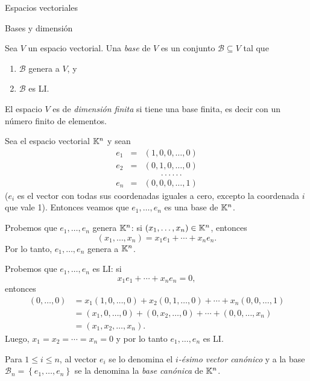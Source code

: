\begin{chapter}{Espacios vectoriales}
\begin{section}{Bases y dimensi\'on}
 \begin{definicion}\label{def-base}
     Sea $V$ un espacio vectorial. Una \textit{base} de $V$ es un conjunto $\mathcal B \subseteq V$ tal que
     \begin{enumerate}
         \item\label{it.genera} $\mathcal B$ genera a $V$, y
         \item\label{it.li} $\mathcal B$ es LI.
     \end{enumerate}
      El espacio $V$ es de \textit{dimensión finita} si tiene una base finita,  es decir con  un número finito de elementos.
 \end{definicion}



\begin{ejemplo*} Sea el espacio vectorial $\mathbb K^n$ y sean
    \begin{equation*}
    \begin{array}{rcl}
    e_1 &=& (1,0,0,\ldots,0) \\
    e_2 &=& (0,1,0,\ldots,0) \\
    &&\qquad.\,.\,.\,.\,.\,.\,\\ 
    e_n&=& (0,0,0,\ldots,1)
    \end{array}
    \end{equation*}
    ($e_i$ es el vector con todas sus coordenadas iguales a cero,  excepto  la coordenada $i$ que vale 1). Entonces veamos que  $e_1,\ldots,e_n$ es una base de $\mathbb K^n$.
    
    Probemos que $e_1,\ldots,e_n$ genera  $\mathbb K^n$: si $(x_1,\ldots,x_n) \in \mathbb K^n$,  entonces
        $$
        (x_1,\ldots,x_n) = x_1e_1+\cdots+x_ne_n.
        $$
        Por lo tanto, $e_1,\ldots,e_n$ genera a  $\mathbb K^n$.
        
        Probemos que $e_1,\ldots,e_n$ es LI: si 
        $$
        x_1e_1+\cdots+x_ne_n =0,
        $$
        entonces
        \begin{align*}
            (0,\ldots,0) &= x_1(1,0,\ldots,0)+ x_2(0,1,\ldots,0)+\cdots+x_n(0,0,\ldots,1)\\ 
            &=  (x_1,0,\ldots,0)+(0,x_2,\ldots,0)+\cdots+(0,0,\ldots,x_n)\\ &= (x_1,x_2,\ldots,x_n).
        \end{align*}
        Luego, $x_1= x_2=\cdots=x_n =0$ y por lo tanto $e_1,\ldots,e_n$ es LI.
        
        Para $1 \le i \le n$, al vector $e_i$ se lo denomina el \textit{$i$-ésimo vector canónico}  y a la base $\mathcal B_n = \left\{e_1,\ldots,e_n \right\}$ se la denomina la \textit{base canónica} de $\mathbb K^n$. 
\end{ejemplo*}
 

\end{section}
\end{chapter}
